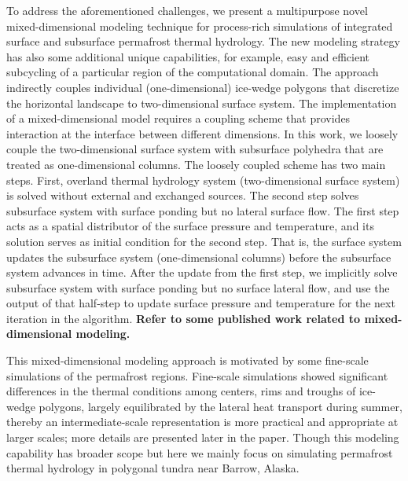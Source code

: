 \documentclass[review]{elsarticle}
\begin{document}
To address the aforementioned challenges, we present a multipurpose novel mixed-dimensional modeling technique for process-rich simulations of integrated surface and subsurface permafrost thermal hydrology. The new modeling strategy has also some additional unique capabilities, for example, easy and efficient subcycling of a particular region of the computational domain. The approach indirectly couples individual (one-dimensional) ice-wedge polygons that discretize the horizontal landscape to two-dimensional surface system. The implementation of a mixed-dimensional model requires a coupling scheme that provides interaction at the interface between different dimensions. In this work, we loosely couple the two-dimensional surface system with subsurface polyhedra that are treated as one-dimensional columns.  The loosely coupled scheme has two main steps. First, overland thermal hydrology system (two-dimensional surface system) is solved without external and exchanged sources. The second step solves subsurface system with surface ponding but no lateral surface flow. The first step acts as a spatial distributor of the surface pressure and temperature, and its solution serves as initial condition for the second step. That is, the surface system updates the subsurface system (one-dimensional columns) before the subsurface system advances in time. After the update from the first step, we implicitly solve subsurface system with surface ponding but no surface lateral flow, and use the output of that half-step to update surface pressure and temperature for the next iteration in the algorithm. \textbf{Refer to some published work related to mixed-dimensional modeling.}

This mixed-dimensional modeling approach is motivated by some fine-scale simulations of the permafrost regions. Fine-scale simulations showed significant differences in the thermal conditions among centers, rims and troughs of ice-wedge polygons, largely equilibrated by the lateral heat transport during summer, thereby an intermediate-scale representation is more practical and appropriate at larger scales; more details are presented later in the paper. Though this modeling capability has broader scope but here we mainly focus on simulating permafrost thermal hydrology in polygonal tundra near Barrow, Alaska. 
\end{document}

